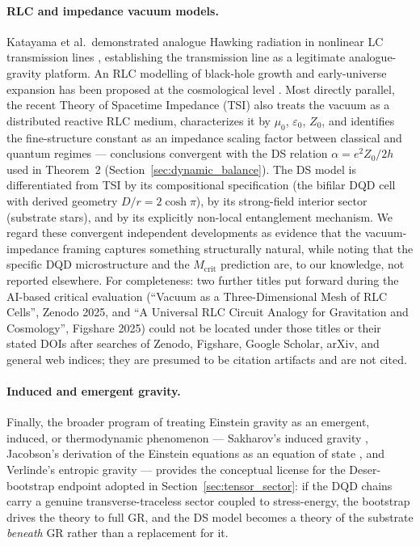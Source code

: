\documentclass[11pt,a4paper]{article}
\theoremstyle{plain}
\theoremstyle{remark}
\begin{document}
\paragraph{RLC and impedance vacuum models.} Katayama et al.\ demonstrated analogue Hawking radiation in nonlinear LC transmission lines \cite{katayama2021}, establishing the transmission line as a legitimate analogue-gravity platform. An RLC modelling of black-hole growth and early-universe expansion has been proposed at the cosmological level \cite{rlcbh2023}. Most directly parallel, the recent Theory of Spacetime Impedance (TSI) \cite{tsi2026} also treats the vacuum as a distributed reactive RLC medium, characterizes it by $\mu_0$, $\varepsilon_0$, $Z_0$, and identifies the fine-structure constant as an impedance scaling factor between classical and quantum regimes --- conclusions convergent with the DS relation $\alpha = e^2 Z_0/2h$ used in Theorem~2 (Section~\ref{sec:dynamic_balance}). The DS model is differentiated from TSI by its compositional specification (the bifilar DQD cell with derived geometry $D/r = 2\cosh\pi$), by its strong-field interior sector (substrate stars), and by its explicitly non-local entanglement mechanism. We regard these convergent independent developments as evidence that the vacuum-impedance framing captures something structurally natural, while noting that the specific DQD microstructure and the $M_{\text{crit}}$ prediction are, to our knowledge, not reported elsewhere. For completeness: two further titles put forward during the AI-based critical evaluation (``Vacuum as a Three-Dimensional Mesh of RLC Cells'', Zenodo 2025, and ``A Universal RLC Circuit Analogy for Gravitation and Cosmology'', Figshare 2025) could not be located under those titles or their stated DOIs after searches of Zenodo, Figshare, Google Scholar, arXiv, and general web indices; they are presumed to be citation artifacts and are not cited.

\paragraph{Induced and emergent gravity.} Finally, the broader program of treating Einstein gravity as an emergent, induced, or thermodynamic phenomenon --- Sakharov's induced gravity \cite{sakharov}, Jacobson's derivation of the Einstein equations as an equation of state \cite{jacobson1995}, and Verlinde's entropic gravity \cite{verlinde2011} --- provides the conceptual license for the Deser-bootstrap endpoint adopted in Section~\ref{sec:tensor_sector}: if the DQD chains carry a genuine transverse-traceless sector coupled to stress-energy, the bootstrap drives the theory to full GR, and the DS model becomes a theory of the substrate \emph{beneath} GR rather than a replacement for it.
\end{document}
